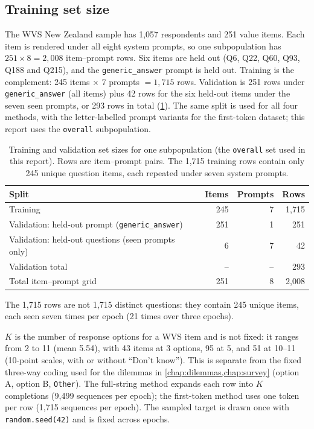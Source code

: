 {\small}

\subsection{Training set size}
\label{subsec:training-set-size}

The WVS New Zealand sample has 1,057 respondents and 251 value items. Each
item is rendered under all eight system prompts, so one subpopulation has
$251 \times 8 = 2{,}008$ item--prompt rows. Six items are held out (Q6,
Q22, Q60, Q93, Q188 and Q215), and the \texttt{generic\_answer} prompt is
held out. Training is the complement: 245 items $\times$ 7 prompts $=
1{,}715$ rows. Validation is 251 rows under \texttt{generic\_answer} (all
items) plus 42 rows for the six held-out items under the seven seen
prompts, or 293 rows in total (\ref{tab:training-set-size}). The same
split is used for all four methods, with the letter-labelled prompt
variants for the first-token dataset; this report uses the \texttt{overall}
subpopulation.

\begin{table}[htbp]
  \centering
  \small
  \caption{Training and validation set sizes for one subpopulation (the
  \texttt{overall} set used in this report). Rows are item--prompt pairs.
  The 1,715 training rows contain only 245 unique question items, each
  repeated under seven system prompts.}
  \label{tab:training-set-size}
  \begin{tabular}{@{}lrrr@{}}
    \toprule
    Split & Items & Prompts & Rows \\
    \midrule
    Training & 245 & 7 & 1,715 \\
    Validation: held-out prompt (\texttt{generic\_answer}) & 251 & 1 & 251 \\
    Validation: held-out questions (seen prompts only) & 6 & 7 & 42 \\
    \midrule
    Validation total & -- & -- & 293 \\
    Total item--prompt grid & 251 & 8 & 2,008 \\
    \bottomrule
  \end{tabular}
\end{table}

The 1,715 rows are not 1,715 distinct questions: they contain 245 unique
items, each seen seven times per epoch (21 times over three epochs).

$K$ is the number of response options for a WVS item and is not fixed: it
ranges from 2 to 11 (mean 5.54), with 43 items at 3 options, 95 at 5, and
51 at 10--11 (10-point scales, with or without ``Don't know''). This is
separate from the fixed three-way coding used for the dilemmas in
\ref{chap:dilemmas,chap:survey} (option A, option B, \texttt{Other}). The
full-string
method expands each row into $K$ completions (9,499 sequences per epoch);
the first-token method uses one token per row (1,715 sequences per epoch).
The sampled target is drawn once with \texttt{random.seed(42)} and is fixed
across epochs.

